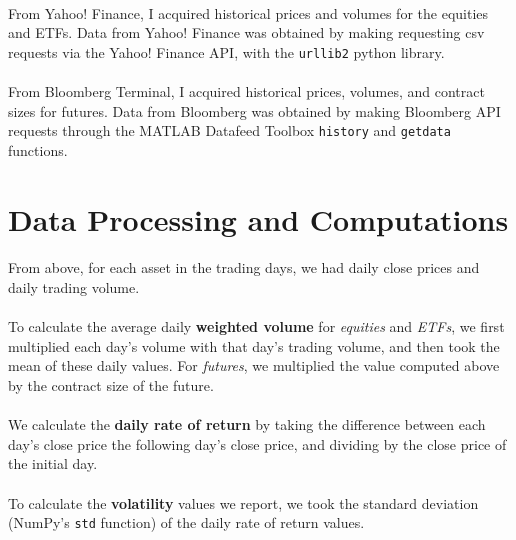 \documentclass[11pt]{article}
\begin{document}
\paragraph{}
From Yahoo! Finance, I acquired historical prices and volumes for the equities and ETFs. Data from Yahoo! Finance was obtained by making requesting csv requests via the Yahoo! Finance API, with the \texttt{urllib2} python library.

\paragraph{}
From Bloomberg Terminal, I acquired historical prices, volumes, and contract sizes for  futures. Data from Bloomberg was obtained by making Bloomberg API requests through the MATLAB Datafeed Toolbox \texttt{history} and \texttt{getdata} functions.

\section{Data Processing and Computations}

\paragraph{}
From above, for each asset in the trading days, we had daily close prices and daily trading volume.

\paragraph{}
To calculate the average daily \textbf{weighted volume} for \textit{equities} and \textit{ETFs}, we first multiplied each day's volume with that day's trading volume, and then took the mean of these daily values. For \textit{futures}, we multiplied the value computed above by the contract size of the future.

\paragraph{}
We calculate the \textbf{daily rate of return} by taking the difference between each day's close price the following day's close price, and dividing by the close price of the initial day.

\paragraph{}
To calculate the \textbf{volatility} values we report, we took the standard deviation (NumPy's \texttt{std} function) of the daily rate of return values.
\end{document}
